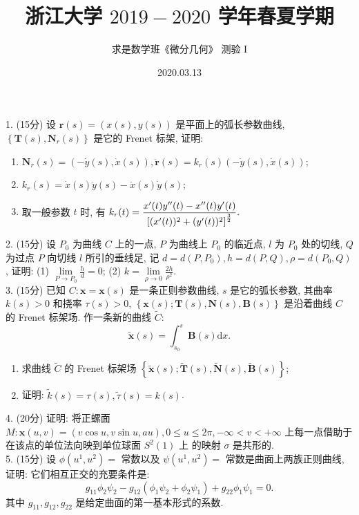 \documentclass[UTF8]{ctexart}
\title{\LARGE \textbf{浙江大学 $2019-2020$ 学年春夏学期}}
\author{求是数学班《微分几何》 测验 I}
\date{2020.03.13}
\renewcommand{\d}{\text{d}}
\begin{document}
\maketitle

1. (15分) 设 $\textbf{r}(s)=(x(s),y(s))$ 是平面上的弧长参数曲线, $\left\{\textbf{T}(s),\textbf{N}_r(s)\right\}$ 是它的 Frenet 标架, 证明:
\begin{enumerate}[(1)]
    \item $\textbf{N}_r(s)=(-\dot{y}(s),\dot{x}(s)), \ddot{\textbf{r}}(s)=k_r(s)(-\dot{y}(s),\dot{x}(s))$;
    \item $k_r(s)=\dot{x}(s)\ddot{y}(s)-\ddot{x}(s)\dot{y}(s)$;
    \item 取一般参数 $t$ 时, 有 $\displaystyle k_r(t)=\frac{x'(t)y''(t)-x''(t)y'(t)}{\left[(x'(t))^2+(y'(t))^2\right]^{\frac{3}{2}}}.\\$
\end{enumerate}

2. (15分) 设 $P_0$ 为曲线 $C$ 上的一点, $P$ 为曲线上 $P_0$ 的临近点, $l$ 为 $P_0$ 处的切线, $Q$ 为过点 $P$ 向切线 $l$ 所引的垂线足, 记 $d=d(P,P_0),h=d(P,Q),\rho=d(P_0,Q)$, 
证明: (1) $\displaystyle \lim\limits_{P\to P_0}\frac{h}{d}=0$; \quad (2) $k=\displaystyle \lim\limits_{\rho\to0}\frac{2h}{\rho^2}$.
\\

3. (15分) 已知 $C: \textbf{x}=\textbf{x}(s)$ 是一条正则参数曲线, $s$ 是它的弧长参数, 其曲率 $k(s)>0$ 和挠率 $\tau(s)>0$, 
$\left\{\textbf{x}(s);\textbf{T}(s),\textbf{N}(s),\textbf{B}(s)\right\}$ 是沿着曲线 $C$ 的 Frenet 标架场. 作一条新的曲线 $\tilde{C}:$
\[
\tilde{\textbf{x}}(s)=\int_{s_0}^{s}\textbf{B}(s)\d x. 
\]
\begin{enumerate}[(1)]
    \item 求曲线 $\tilde{C}$ 的 Frenet 标架场 $\left\{\tilde{\textbf{x}}(s);\tilde{\textbf{T}}(s),\tilde{\textbf{N}}(s),\tilde{\textbf{B}}(s)\right\}$;
    \item 证明: $\tilde{k}(s)=\tau(s),\tilde{\tau}(s)=k(s)$.\\
\end{enumerate}

4. (20分) 证明: 将正螺面 $M:\textbf{x}(u,v)=(v\cos u,v\sin u,au),0\le u\le 2\pi,-\infty<v<+\infty$ 上每一点借助于在该点的单位法向映到单位球面 $S^2(1)$ 上
的映射 $\sigma$ 是共形的.
\\

5. (15分) 设 $\phi(u^1,u^2)=$ 常数以及 $\psi(u^1,u^2)=$ 常数是曲面上两族正则曲线, 证明: 它们相互正交的充要条件是:
\[
g_{11}\phi_2\psi_2-g_{12}(\phi_1\psi_2+\phi_2\psi_1)+g_{22}\phi_1\psi_1=0.    
\]
其中 $g_{11},g_{12},g_{22}$ 是给定曲面的第一基本形式的系数.
\\
\end{document}
